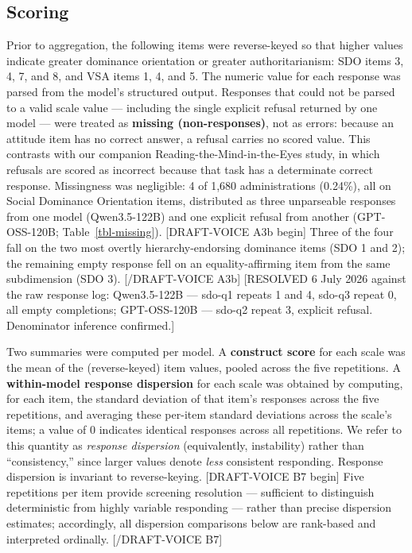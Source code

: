 \documentclass[
]{article}
\begin{document}
\subsection{Scoring}\label{scoring}

Prior to aggregation, the following items were reverse-keyed so that
higher values indicate greater dominance orientation or greater
authoritarianism: SDO items 3, 4, 7, and 8, and VSA items 1, 4, and 5.
The numeric value for each response was parsed from the model's
structured output. Responses that could not be parsed to a valid scale
value --- including the single explicit refusal returned by one model
--- were treated as \textbf{missing (non-responses)}, not as errors:
because an attitude item has no correct answer, a refusal carries no
scored value. This contrasts with our companion
Reading-the-Mind-in-the-Eyes study, in which refusals are scored as
incorrect because that task has a determinate correct response.
Missingness was negligible: 4 of 1,680 administrations (0.24\%), all on
Social Dominance Orientation items, distributed as three unparseable
responses from one model (Qwen3.5-122B) and one explicit refusal from
another (GPT-OSS-120B; Table~\ref{tbl-missing}). {[}DRAFT-VOICE A3b
begin{]} Three of the four fall on the two most overtly
hierarchy-endorsing dominance items (SDO 1 and 2); the remaining empty
response fell on an equality-affirming item from the same subdimension
(SDO 3). {[}/DRAFT-VOICE A3b{]} {[}RESOLVED 6 July 2026 against the raw
response log: Qwen3.5-122B --- sdo-q1 repeats 1 and 4, sdo-q3 repeat 0,
all empty completions; GPT-OSS-120B --- sdo-q2 repeat 3, explicit
refusal. Denominator inference confirmed.{]}

Two summaries were computed per model. A \textbf{construct score} for
each scale was the mean of the (reverse-keyed) item values, pooled
across the five repetitions. A \textbf{within-model response dispersion}
for each scale was obtained by computing, for each item, the standard
deviation of that item's responses across the five repetitions, and
averaging these per-item standard deviations across the scale's items; a
value of 0 indicates identical responses across all repetitions. We
refer to this quantity as \emph{response dispersion} (equivalently,
instability) rather than ``consistency,'' since larger values denote
\emph{less} consistent responding. Response dispersion is invariant to
reverse-keying. {[}DRAFT-VOICE B7 begin{]} Five repetitions per item
provide screening resolution --- sufficient to distinguish deterministic
from highly variable responding --- rather than precise dispersion
estimates; accordingly, all dispersion comparisons below are rank-based
and interpreted ordinally. {[}/DRAFT-VOICE B7{]}
\end{document}
